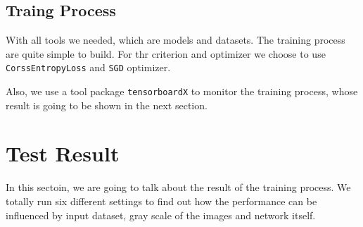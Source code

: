 \documentclass[12pt]{article}
\begin{document}
\subsection{Traing Process}
With all tools we needed, which are models and datasets. The training process are quite simple to build. For thr criterion and optimizer we choose to use \verb|CorssEntropyLoss| and \verb|SGD| optimizer. 

Also, we use a tool package \verb|tensorboardX| to monitor the training process, whose result is going to be shown in the next section.

\section{Test Result}
In this sectoin, we are going to talk about the result of the training process. We totally run six different settings to find out how the performance can be influenced by input dataset, gray scale of the images and network itself.
\end{document}
